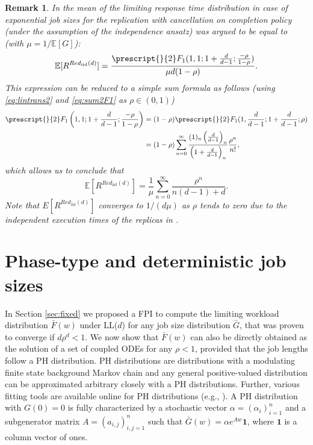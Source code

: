 \documentclass[12pt]{report}
\newcommand{\E}{\mathbb{E}}
\newtheorem{remark}{Remark}
\begin{document}
\begin{remark}
In \cite{gardnerOR} the mean of the limiting response time distribution
in case of exponential job sizes for the replication with cancellation on completion policy (under the {\it assumption} of the independence ansatz) was argued to be equal to (with $\mu = 1/\E[G]$):
$$
\E[R^{Red_{\text{iid}}(d)}] = \frac{\prescript{}{2}F_1(1,1;1+\frac{d}{d-1};\frac{-\rho}{1-\rho})}{\mu d(1-\rho)}.
$$
This expression can be reduced to a simple sum formula as follows (using \eqref{eq:lintrans2} and \eqref{eq:sum2F1} as $\rho \in (0,1)$) 
\begin{align*}
\prescript{}{2}F_1\left(1,1;1+\frac{d}{d-1};\frac{-\rho}{1-\rho}\right)
&= (1-\rho) \prescript{}{2}F_1(1,\frac{d}{d-1};1+\frac{d}{d-1};\rho)\\
&= (1-\rho) \sum_{n=0}^{\infty} \frac{(1)_n \left( \frac{d}{d-1}\right)_n}{\left(1+\frac{d}{d-1}\right)_n} \frac{\rho^n}{n!},
\end{align*}
which allows us to conclude that
\[\E[R^{Red_{\text{iid}}(d)}] = \frac{1}{\mu} \sum_{n=0}^\infty \frac{\rho^n}{n(d-1)+d}.
\]
Note that $E[R^{Red_{\text{iid}}(d)}]$ converges to $1/(d\mu)$ as $\rho$ tends to zero due to the independent execution times of the replicas in \cite{gardnerOR}.
\end{remark}

\section{Phase-type and deterministic job sizes}\label{sec:ph}

In Section \ref{sec:fixed} we proposed a FPI to compute the limiting workload distribution $\bar F(w)$ under LL($d$) 
for any job size distribution $\bar G$, that was proven to converge if
$d \rho^d < 1$. We now show that $\bar F(w)$ can also be directly obtained as the solution of a set of coupled ODEs for any $\rho < 1$, provided that the job lengths follow a PH distribution. 
PH distributions are distributions with a modulating finite state background Markov chain \cite{latouche1} and any general positive-valued distribution 
can be approximated arbitrary closely with a PH distributions. Further, various fitting tools are available online 
for PH distributions (e.g., \cite{panchenko1,Kriege2014}). 
A PH distribution with $G(0)=0$ is fully characterized by a stochastic vector $\alpha = (\alpha_i)_{i=1}^n$ and a subgenerator matrix  $A = (a_{i,j})_{i,j=1}^n$
such that $\bar G(w) = \alpha e^{Aw} \textbf{1}$, where $\textbf{1}$ is a column vector of ones.
 
\end{document}
